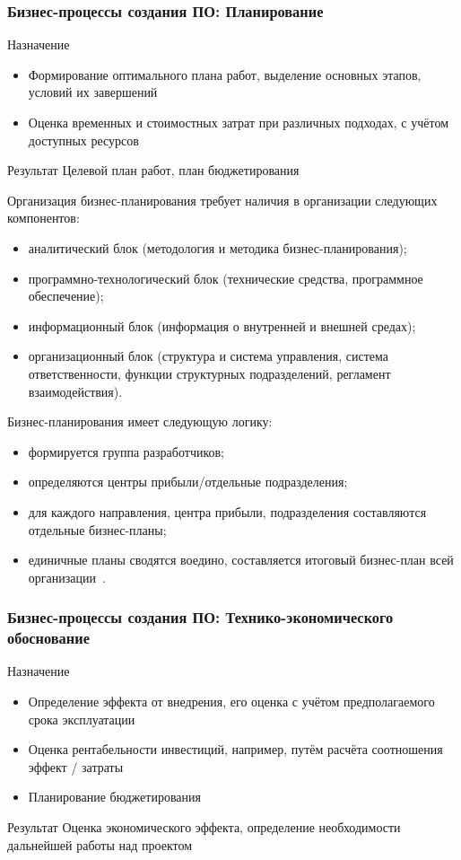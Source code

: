\documentclass{../industrial-development}
\begin{document}
\begin{frame} \frametitle{Бизнес-процессы создания ПО: Планирование}
	\begin{block}{Назначение}
		\begin{itemize}
			\item Формирование оптимального плана работ, выделение основных этапов, условий их завершений
			\item Оценка временных и стоимостных затрат при различных подходах, с учётом доступных ресурсов
		\end{itemize}
	\end{block}
	\begin{block}{Результат}
		Целевой план работ, план бюджетирования
	\end{block}
\end{frame}

\lecturenotes

Организация бизнес-планирования требует наличия в организации следующих компонентов:
\begin{itemize}
	\item аналитический блок (методология и методика бизнес-планирования);
	\item программно-технологический блок (технические средства, программное обеспечение);
	\item информационный блок (информация о внутренней и внешней средах);
	\item организационный блок (структура и система управления, система ответственности, функции структурных подразделений, регламент взаимодействия).
\end{itemize}

Бизнес-планирования имеет следующую логику:
\begin{itemize}
	\item формируется группа разработчиков;
	\item определяются центры прибыли/отдельные подразделения;
	\item для каждого направления, центра прибыли, подразделения составляются отдельные бизнес-планы;
	\item единичные планы сводятся воедино, составляется итоговый бизнес-план всей организации~\cite{Centeryf}.
\end{itemize}


\begin{frame} \frametitle{Бизнес-процессы создания ПО: Технико-экономического обоснование}
	\begin{block}{Назначение}
		\begin{itemize}
			\item Определение эффекта от внедрения, его оценка с учётом предполагаемого срока эксплуатации
			\item Оценка рентабельности инвестиций, например, путём расчёта соотношения эффект / затраты
			\item Планирование бюджетирования
		\end{itemize}
	\end{block}
	\begin{block}{Результат}
		Оценка экономического эффекта, определение необходимости дальнейшей работы над проектом
	\end{block}
\end{frame}
\end{document}
